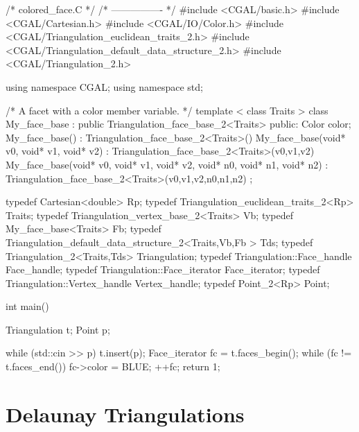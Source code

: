 \begin{ccExampleCode}
/*  colored_face.C   */     
/*  ---------------- */
#include <CGAL/basic.h>
#include <CGAL/Cartesian.h>
#include <CGAL/IO/Color.h>
#include <CGAL/Triangulation_euclidean_traits_2.h>
#include <CGAL/Triangulation_default_data_structure_2.h>
#include <CGAL/Triangulation_2.h>

using namespace CGAL;
using namespace std;

/* A facet with a color member variable. */
template < class Traits >
class My_face_base : public Triangulation_face_base_2<Traits>
{
public:
  Color color;
  My_face_base() :
    Triangulation_face_base_2<Traits>() {}
  My_face_base(void* v0, void* v1, void* v2) : 
    Triangulation_face_base_2<Traits>(v0,v1,v2) {}
  My_face_base(void* v0, void* v1, void* v2, void* n0, void* n1, void* n2) : 
    Triangulation_face_base_2<Traits>(v0,v1,v2,n0,n1,n2) {}
};

typedef Cartesian<double> Rp;
typedef Triangulation_euclidean_traits_2<Rp> Traits;
typedef Triangulation_vertex_base_2<Traits> Vb;
typedef My_face_base<Traits> Fb;
typedef Triangulation_default_data_structure_2<Traits,Vb,Fb > Tds;
typedef Triangulation_2<Traits,Tds> Triangulation;
typedef Triangulation::Face_handle Face_handle;
typedef Triangulation::Face_iterator Face_iterator;
typedef Triangulation::Vertex_handle Vertex_handle;
typedef Point_2<Rp>  Point;

int main() {
  Triangulation t;
  Point p;

  while (std::cin >> p){
    t.insert(p);
  }
  Face_iterator fc = t.faces_begin();
  while (fc != t.faces_end()) {
    fc->color = BLUE;
    ++fc;
  }
  return 1;
}
\end{ccExampleCode}


\section{Delaunay Triangulations}
\label{I1_Sect_Delaunay}

